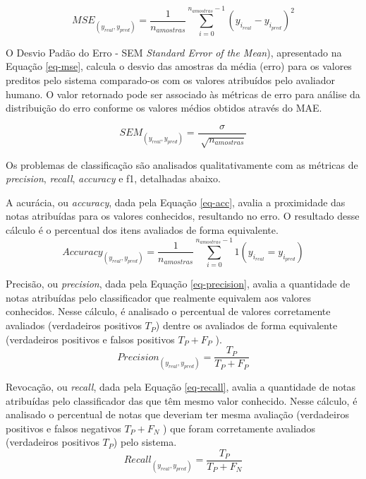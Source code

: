 \begin{equation}
MSE_(y_{real},y_{pred}) = \frac{1}{n_{amostras}}\sum_{i=0}^{n_{amostras}-1}{(y_{i_{real}}-y_{i_{pred}})}^{2}
\label{eq-mse}
\end{equation}

O Desvio Padão do Erro - SEM \textit{Standard Error of the Mean}), apresentado na Equação \ref{eq-mse}, calcula o desvio das amostras da média (erro) para os valores preditos pelo sistema comparado-os com os valores atribuídos pelo avaliador humano. O valor retornado pode ser associado às métricas de erro para análise da distribuição do erro conforme os valores médios obtidos através do MAE.

\begin{equation}
SEM_(y_{real},y_{pred}) = \frac{\sigma}{\sqrt[]{n_{amostras}}}
\label{eq-sem}
\end{equation}

Os problemas de classificação são analisados qualitativamente com as métricas de \textit{precision}, \textit{recall}, \textit{accuracy} e f1, detalhadas abaixo.

A acurácia, ou \textit{accuracy}, dada pela Equação \ref{eq-acc}, avalia a proximidade das notas atribuídas para os valores conhecidos, resultando no erro. O resultado desse cálculo é o percentual dos itens avaliados de forma equivalente.
\begin{equation}
Accuracy_(y_{real},y_{pred}) = \frac{1}{n_{amostras}}\sum_{i=0}^{n_{amostras}-1}{1(y_{i_{real}}=y_{i_{pred}})}
\label{eq-acc}
\end{equation}

Precisão, ou \textit{precision}, dada pela Equação \ref{eq-precision}, avalia a quantidade de notas atribuídas pelo classificador que realmente equivalem aos valores conhecidos. Nesse cálculo, é analisado o percentual de valores corretamente avaliados (verdadeiros positivos $ T_{P} $) dentre os avaliados de forma equivalente (verdadeiros positivos e falsos positivos $ T_{P} + F_{P} $ ).
\begin{equation}
Precision_(y_{real},y_{pred}) = \frac{T_{P}}{T_{P}+F_{P}}
\label{eq-precision}
\end{equation}

Revocação, ou \textit{recall}, dada pela Equação \ref{eq-recall}, avalia a quantidade de notas atribuídas pelo classificador das que têm mesmo valor conhecido. Nesse cálculo, é analisado o percentual de notas que deveriam ter mesma avaliação (verdadeiros positivos e falsos negativos $ T_{P} + F_{N} $ ) que foram corretamente avaliados (verdadeiros positivos $ T_{P} $) pelo sistema.
\begin{equation}
Recall_(y_{real},y_{pred}) = \frac{T_{P}}{T_{P}+F_{N}}
\label{eq-recall}
\end{equation}

